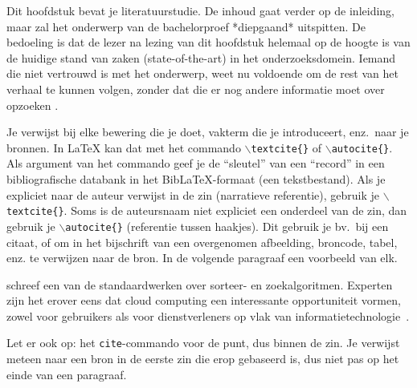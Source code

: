 \newline
\newline
Dit hoofdstuk bevat je literatuurstudie. De inhoud gaat verder op de inleiding, maar zal het onderwerp van de bachelorproef *diepgaand* uitspitten. De bedoeling is dat de lezer na lezing van dit hoofdstuk helemaal op de hoogte is van de huidige stand van zaken (state-of-the-art) in het onderzoeksdomein. Iemand die niet vertrouwd is met het onderwerp, weet nu voldoende om de rest van het verhaal te kunnen volgen, zonder dat die er nog andere informatie moet over opzoeken \autocite{Pollefliet2011}.

Je verwijst bij elke bewering die je doet, vakterm die je introduceert, enz.\ naar je bronnen. In \LaTeX{} kan dat met het commando \texttt{$\backslash${textcite\{\}}} of \texttt{$\backslash${autocite\{\}}}. Als argument van het commando geef je de ``sleutel'' van een ``record'' in een bibliografische databank in het Bib\LaTeX{}-formaat (een tekstbestand). Als je expliciet naar de auteur verwijst in de zin (narratieve referentie), gebruik je \texttt{$\backslash${}textcite\{\}}. Soms is de auteursnaam niet expliciet een onderdeel van de zin, dan gebruik je \texttt{$\backslash${}autocite\{\}} (referentie tussen haakjes). Dit gebruik je bv.~bij een citaat, of om in het bijschrift van een overgenomen afbeelding, broncode, tabel, enz. te verwijzen naar de bron. In de volgende paragraaf een voorbeeld van elk.

\textcite{Knuth1998} schreef een van de standaardwerken over sorteer- en zoekalgoritmen. Experten zijn het erover eens dat cloud computing een interessante opportuniteit vormen, zowel voor gebruikers als voor dienstverleners op vlak van informatietechnologie~\autocite{Creeger2009}.

Let er ook op: het \texttt{cite}-commando voor de punt, dus binnen de zin. Je verwijst meteen naar een bron in de eerste zin die erop gebaseerd is, dus niet pas op het einde van een paragraaf.

\lipsum[7-20]
